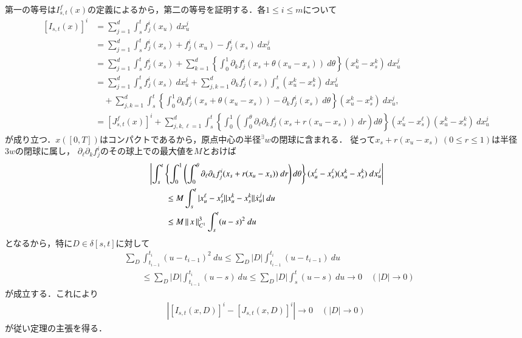 	\begin{prf}
		第一の等号は$I^f_{s,t}(x)$の定義によるから，第二の等号を証明する．各$1 \leq i \leq m$について
		\begin{align}
			\left[ I_{s,t}(x) \right]^i
			&= \sum_{j=1}^d \int_s^t f_j^i(x_u)\ dx^j_u \\
			&= \sum_{j=1}^d \int_s^t f_j^i(x_s) + f_j^i(x_u) - f_j^i(x_s)\ dx^j_u \\
			&= \sum_{j=1}^d \int_s^t f_j^i(x_s) 
				+ \sum_{k=1}^d  \left\{ \int_0^1 \partial_k f_j^i(x_s + \theta(x_u - x_s))\ d\theta \right\} (x^k_u - x^k_s)\ dx^j_u \\
			&= \sum_{j=1}^d \int_s^t f_j^i(x_s)\ dx^j_u + \sum_{j,k=1}^d \partial_k f_j^i(x_s) \int_s^t (x^k_u - x^k_s)\ dx^j_u \\
				&\quad + \sum_{j,k=1}^d \int_s^t 
				\left\{ \int_0^1 \partial_k f_j^i(x_s + \theta(x_u - x_s)) - \partial_k f_j^i(x_s)\ d\theta \right\} (x^k_u - x^k_s)\ dx^j_u, \\
			&= \left[ J^f_{s,t}(x) \right]^i
				+ \sum_{j,k,\ell=1}^d \int_s^t 
				\left\{ \int_0^1 \left( \int_0^\theta \partial_\ell \partial_k f_j^i(x_s + r(x_u - x_s))\ dr\right) d\theta \right\} (x^\ell_u - x^\ell_s)(x^k_u - x^k_s)\ dx^j_u
		\end{align}
		が成り立つ．$x([0,T])$はコンパクトであるから，原点中心の半径${}^\exists w$の閉球に含まれる．
		従って$x_s + r(x_u - x_s)\ (0 \leq r \leq 1)$は半径$3w$の閉球に属し，
		$\partial_\ell \partial_k f_j^i$のその球上での最大値を$M$とおけば
		\begin{align}
			&\left| \int_s^t 
				\left\{ \int_0^1 \left( \int_0^\theta \partial_\ell \partial_k f_j^i(x_s + r(x_u - x_s))\ dr\right) d\theta \right\} (x^\ell_u - x^\ell_s)(x^k_u - x^k_s)\ dx^j_u \right| \\
			&\qquad \leq M \int_s^t |x^\ell_u - x^\ell_s||x^k_u - x^k_s| |\dot{x}^j_u|\ du \\
			&\qquad \leq M \left\|\, x\, \right\|_{C^1}^3 \int_s^t (u - s)^2\ du
		\end{align}
		となるから，特に$D \in \delta[s,t]$に対して
		\begin{align}
			&\sum_D \int_{t_{i-1}}^{t_i} (u - t_{i-1})^2\ du
			\leq \sum_D |D| \int_{t_{i-1}}^{t_i} (u - t_{i-1})\ du \\
			&\qquad \leq \sum_D |D| \int_{t_{i-1}}^{t_i} (u - s)\ du
			\leq \sum_D |D| \int_{s}^{t} (u - s)\ du
			\longrightarrow 0 \quad (|D| \longrightarrow 0)
		\end{align}
		が成立する．これにより
		\begin{align}
			\left| \left[ I_{s,t}(x,D) \right]^i - \left[ J_{s,t}(x,D) \right]^i \right| \longrightarrow 0 \quad (|D| \longrightarrow 0)
		\end{align}
		が従い定理の主張を得る．
		\QED
	\end{prf}
	
	
	\begin{screen}
		\begin{thm}
		\end{thm}
	\end{screen}
	
	\begin{screen}
		\begin{thm}
		\end{thm}
	\end{screen}